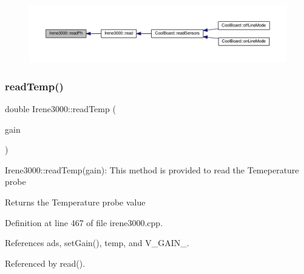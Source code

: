 \nopagebreak
\begin{figure}[H]
\begin{center}
\leavevmode
\includegraphics[width=350pt]{classIrene3000_abf3db725fabb0634ec889b32068a5eec_icgraph}
\end{center}
\end{figure}
\mbox{\label{classIrene3000_a94ad40f281d83ad1be20bf1edd6fe802}} 
\subsubsection{\texorpdfstring{read\+Temp()}{readTemp()}}
{\footnotesize\ttfamily double Irene3000\+::read\+Temp (\begin{DoxyParamCaption}\item[{ads\+Gain\+\_\+t}]{gain }\end{DoxyParamCaption})}

Irene3000\+::read\+Temp(gain)\+: This method is provided to read the Temeperature probe

\begin{DoxyReturn}{Returns}
the Temperature probe value 
\end{DoxyReturn}


Definition at line 467 of file irene3000.\+cpp.



References ads, set\+Gain(), temp, and V\+\_\+\+G\+A\+I\+N\+\_.



Referenced by read().


